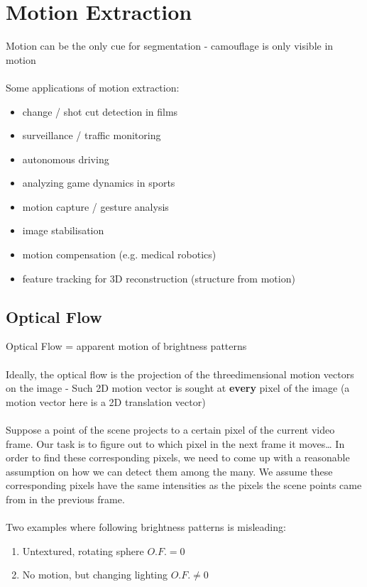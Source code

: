 \section{Motion Extraction}
Motion can be the only cue for segmentation - camouflage is only visible in motion\\
\\
Some applications of motion extraction:
\begin{itemize}
	\item change / shot cut detection in films
	\item surveillance / traffic monitoring
	\item autonomous driving
	\item analyzing game dynamics in sports
	\item motion capture / gesture analysis
	\item image stabilisation
	\item motion compensation (e.g. medical robotics)
	\item feature tracking for 3D reconstruction (structure from motion)
\end{itemize}

\subsection{Optical Flow}
Optical Flow = apparent motion of brightness patterns\\
\\
Ideally, the optical flow is the projection of the threedimensional motion vectors on the image - Such 2D motion vector is sought at \textbf{every} pixel of the image (a motion vector here is a 2D translation vector)\\
\\
Suppose a point of the scene projects to a certain pixel of the current video frame. Our task is to figure out to which pixel in the next frame it moves…
In order to find these corresponding pixels, we need to come up with a reasonable assumption on how we can detect them among the many.
We assume these corresponding pixels have the same intensities as the pixels the scene points came from in the previous frame.\\
\\
Two examples where following brightness patterns is misleading:
\begin{enumerate}
	\item Untextured, rotating sphere $O.F. = 0$
	\item No motion, but changing lighting $O.F. \neq 0$
\end{enumerate}

